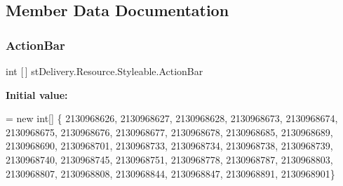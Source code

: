 \subsection{Member Data Documentation}
\mbox{\label{classst_delivery_1_1_resource_1_1_styleable_a2fb1d503844b1ff0350422ddb3289409}} 
\subsubsection{\texorpdfstring{Action\+Bar}{ActionBar}}
{\footnotesize\ttfamily int \mbox{[}$\,$\mbox{]} st\+Delivery.\+Resource.\+Styleable.\+Action\+Bar\hspace{0.3cm}{\ttfamily [static]}}

{\bfseries Initial value\+:}
\begin{DoxyCode}
= \textcolor{keyword}{new} \textcolor{keywordtype}{int}[] \{
                    2130968626,
                    2130968627,
                    2130968628,
                    2130968673,
                    2130968674,
                    2130968675,
                    2130968676,
                    2130968677,
                    2130968678,
                    2130968685,
                    2130968689,
                    2130968690,
                    2130968701,
                    2130968733,
                    2130968734,
                    2130968738,
                    2130968739,
                    2130968740,
                    2130968745,
                    2130968751,
                    2130968778,
                    2130968787,
                    2130968803,
                    2130968807,
                    2130968808,
                    2130968844,
                    2130968847,
                    2130968891,
                    2130968901\}
\end{DoxyCode}
\mbox{\label{classst_delivery_1_1_resource_1_1_styleable_a733651b6410d44e009f7b06ae2b2bc30}} 
